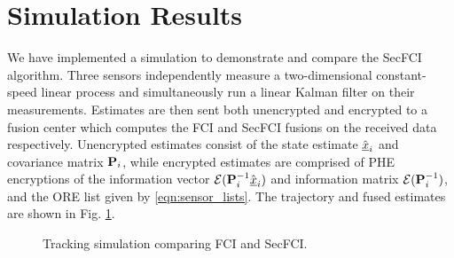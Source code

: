 \documentclass[letterpaper, 10 pt, conference]{ieeeconf}  %
\begin{document}



\section{Simulation Results} \label{sec:results}
We have implemented a simulation to demonstrate and compare the SecFCI algorithm. Three sensors independently measure a two-dimensional constant-speed linear process and simultaneously run a linear Kalman filter on their measurements. Estimates are then sent both unencrypted and encrypted to a fusion center which computes the FCI and SecFCI fusions on the received data respectively. Unencrypted estimates consist of the state estimate $\hat{{\underline{x}}}_i$ and covariance matrix ${{\mathbf{P}}}_i$, while encrypted estimates are comprised of PHE encryptions of the information vector $\mathcal{E}({{\mathbf{P}}}^{-1}_i\hat{{\underline{x}}}_i)$ and information matrix $\mathcal{E}({{\mathbf{P}}}^{-1}_i)$, and the ORE list given by \eqref{eqn:sensor_lists}. The trajectory and fused estimates are shown in Fig. \ref{fig:fci_secfci_traj}.
\begin{figure}[tb]
   \vspace{-5pt}
   \begin{center}
      
   \end{center}
   \vspace{-10pt}
   \caption{Tracking simulation comparing FCI and SecFCI.}
   \label{fig:fci_secfci_traj}
\end{figure}
\end{document}
